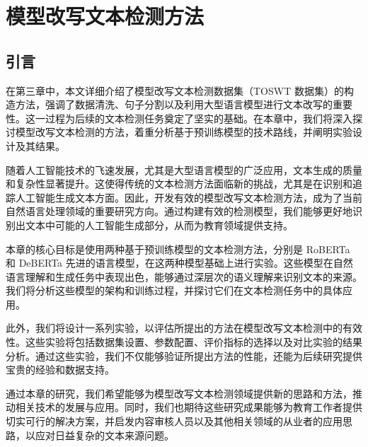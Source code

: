 
\chapter{模型改写文本检测方法}
\label{chap:method}

\section{引言}
\label{sec:method-intro}

在第三章中，本文详细介绍了模型改写文本检测数据集（TOSWT 数据集）的构造方法，强调了数据清洗、句子分割以及利用大型语言模型进行文本改写的重要性。这一过程为后续的文本检测任务奠定了坚实的基础。在本章中，我们将深入探讨模型改写文本检测的方法，着重分析基于预训练模型的技术路线，并阐明实验设计及其结果。

随着人工智能技术的飞速发展，尤其是大型语言模型的广泛应用，文本生成的质量和复杂性显著提升。这使得传统的文本检测方法面临新的挑战，尤其是在识别和追踪人工智能生成文本方面。因此，开发有效的模型改写文本检测方法，成为了当前自然语言处理领域的重要研究方向。通过构建有效的检测模型，我们能够更好地识别出文本中可能的人工智能生成部分，从而为教育领域提供支持。

本章的核心目标是使用两种基于预训练模型的文本检测方法，分别是 RoBERTa 和 DeBERTa 先进的语言模型，在这两种模型基础上进行实验。这些模型在自然语言理解和生成任务中表现出色，能够通过深层次的语义理解来识别文本的来源。我们将分析这些模型的架构和训练过程，并探讨它们在文本检测任务中的具体应用。

此外，我们将设计一系列实验，以评估所提出的方法在模型改写文本检测中的有效性。这些实验将包括数据集设置、参数配置、评价指标的选择以及对比实验的结果分析。通过这些实验，我们不仅能够验证所提出方法的性能，还能为后续研究提供宝贵的经验和数据支持。

通过本章的研究，我们希望能够为模型改写文本检测领域提供新的思路和方法，推动相关技术的发展与应用。同时，我们也期待这些研究成果能够为教育工作者提供切实可行的解决方案，并启发内容审核人员以及其他相关领域的从业者的应用思路，以应对日益复杂的文本来源问题。


